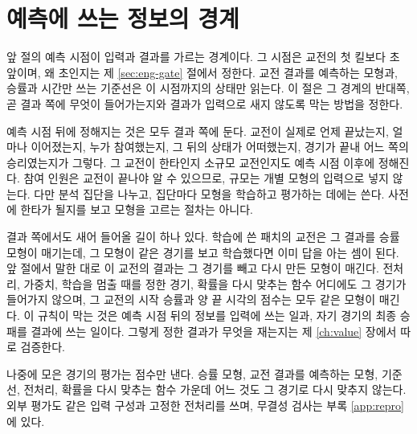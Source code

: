 \section{예측에 쓰는 정보의 경계}
\label{sec:data-contract}

앞 절의 예측 시점이 입력과 결과를 가르는 경계이다. 그 시점은 교전의 첫 킬보다 \constB{}초 앞이며, 왜 \constB{}초인지는 제 \ref{sec:eng-gate} 절에서 정한다. 교전 결과를 예측하는 모형과, 승률과 시간만 쓰는 기준선은 이 시점까지의 상태만 읽는다. 이 절은 그 경계의 반대쪽, 곧 결과 쪽에 무엇이 들어가는지와 결과가 입력으로 새지 않도록 막는 방법을 정한다.

예측 시점 뒤에 정해지는 것은 모두 결과 쪽에 둔다. 교전이 실제로 언제 끝났는지, 얼마나 이어졌는지, 누가 참여했는지, 그 뒤의 상태가 어떠했는지, 경기가 끝내 어느 쪽의 승리였는지가 그렇다. 그 교전이 한타인지 소규모 교전인지도 예측 시점 이후에 정해진다. 참여 인원은 교전이 끝나야 알 수 있으므로, 규모는 개별 모형의 입력으로 넣지 않는다. 다만 분석 집단을 나누고, 집단마다 모형을 학습하고 평가하는 데에는 쓴다. 사전에 한타가 될지를 보고 모형을 고르는 절차는 아니다.

결과 쪽에서도 새어 들어올 길이 하나 있다. 학습에 쓴 패치의 교전은 그 결과를 승률 모형이 매기는데, 그 모형이 같은 경기를 보고 학습했다면 이미 답을 아는 셈이 된다. 앞 절에서 말한 대로 이 교전의 결과는 그 경기를 빼고 다시 만든 모형이 매긴다. 전처리, 가중치, 학습을 멈출 때를 정한 경기, 확률을 다시 맞추는 함수 어디에도 그 경기가 들어가지 않으며, 그 교전의 시작 승률과 양 끝 시각의 점수는 모두 같은 모형이 매긴다. 이 규칙이 막는 것은 예측 시점 뒤의 정보를 입력에 쓰는 일과, 자기 경기의 최종 승패를 결과에 쓰는 일이다. 그렇게 정한 결과가 무엇을 재는지는 제 \ref{ch:value} 장에서 따로 검증한다.

나중에 모은 경기의 평가는 점수만 낸다. 승률 모형, 교전 결과를 예측하는 모형, 기준선, 전처리, 확률을 다시 맞추는 함수 가운데 어느 것도 그 경기로 다시 맞추지 않는다. 외부 평가도 같은 입력 구성과 고정한 전처리를 쓰며, 무결성 검사는 부록 \ref{app:repro}에 있다.
